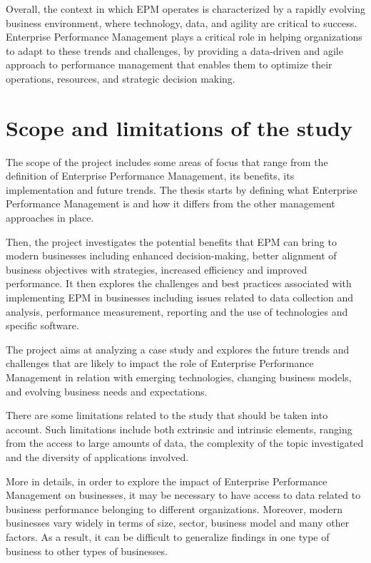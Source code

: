 \documentclass[12pt,a4paper,openright,twoside]{book}
\begin{document}
Overall, the context in which EPM operates is characterized by a rapidly evolving business environment, where technology, data, and agility are critical to success. 
%
Enterprise Performance Management plays a critical role in helping organizations to adapt to these trends and challenges, by providing a data-driven and agile approach to performance management that enables them to optimize their operations, resources, and strategic decision making.

\section{Scope and limitations of the study}

The scope of the project includes some areas of focus that range from the definition of Enterprise Performance Management, its benefits, its implementation and future trends.
%
The thesis starts by defining what Enterprise Performance Management is and how it differs from the other management approaches in place.

Then, the project investigates the potential benefits that EPM can bring to modern businesses including enhanced decision-making, better alignment of business objectives with strategies, increased efficiency and improved performance.
%
It then explores the challenges and best practices associated with implementing EPM in businesses including issues related to data collection and analysis, performance measurement, reporting and the use of technologies and specific software.

The project aims at analyzing a case study and explores the future trends and challenges that are likely to impact the role of Enterprise Performance Management in relation with emerging technologies, changing business models, and evolving business needs and expectations.

There are some limitations related to the study that should be taken into account.
%
Such limitations include both extrinsic and intrinsic elements, ranging from the access to large amounts of data, the complexity of the topic investigated and the diversity of applications involved.

More in details, in order to explore the impact of Enterprise Performance Management on businesses, it may be necessary to have access to data related to business performance belonging to different organizations.
%
Moreover, modern businesses vary widely in terms of size, sector, business model and many other factors.
%
As a result, it can be difficult to generalize findings in one type of business to other types of businesses.
\end{document}
